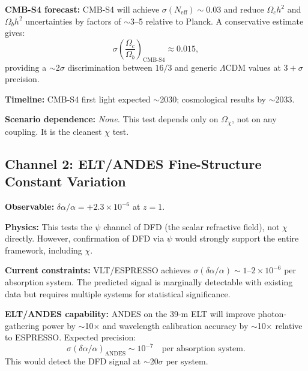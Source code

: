 \documentclass[12pt,a4paper]{article}
\begin{document}
\textbf{CMB-S4 forecast:} CMB-S4 will achieve $\sigma(N_\mathrm{eff})
\sim 0.03$ and reduce $\Omega_c h^2$ and $\Omega_b h^2$ uncertainties
by factors of $\sim$3--5 relative to Planck. A conservative estimate gives:
\begin{equation}
\sigma\!\left(\frac{\Omega_c}{\Omega_b}\right)_\mathrm{CMB\text{-}S4}
\approx 0.015,
\end{equation}
providing a $\sim$2$\sigma$ discrimination between $16/3$ and
generic $\Lambda$CDM values at $3{+}\sigma$ precision.

\textbf{Timeline:} CMB-S4 first light expected $\sim$2030;
cosmological results by $\sim$2033.

\textbf{Scenario dependence:} \emph{None.} This test depends only on
$\Omega_\chi$, not on any coupling. It is the cleanest $\chi$ test.

\begin{center}
\end{center}

\subsection{Channel 2: ELT/ANDES Fine-Structure Constant Variation}
\label{sec:andes}

\textbf{Observable:} $\delta\alpha/\alpha = +2.3 \times 10^{-6}$ at $z = 1$.

\textbf{Physics:} This tests the $\psi$ channel of DFD (the scalar
refractive field), not $\chi$ directly. However, confirmation of DFD
via $\psi$ would strongly support the entire framework, including $\chi$.

\textbf{Current constraints:} VLT/ESPRESSO achieves
$\sigma(\delta\alpha/\alpha) \sim 1$--$2 \times 10^{-6}$ per absorption
system. The predicted signal is marginally detectable with existing data
but requires multiple systems for statistical significance.

\textbf{ELT/ANDES capability:} ANDES on the 39-m ELT will improve
photon-gathering power by $\sim$10$\times$ and wavelength calibration
accuracy by $\sim$10$\times$ relative to ESPRESSO. Expected precision:
\begin{equation}
\sigma(\delta\alpha/\alpha)_\mathrm{ANDES} \sim 10^{-7}
\quad\text{per absorption system.}
\end{equation}
This would detect the DFD signal at $\sim$20$\sigma$ per system.
\end{document}
